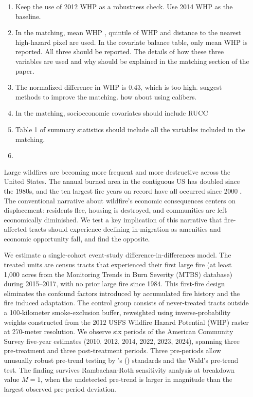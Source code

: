 \documentclass[12pt]{article}
\begin{document}
\begin{enumerate}
  \item Keep the use of 2012 WHP as a robustness check. Use 2014 WHP as the baseline.
  \item In the matching, mean WHP , quintile of WHP and distance to the nearest high-hazard pixel are used. In the covariate balance table, only mean WHP is reported. All three should be reported. The details of how these three variables are used and why should be explained in the matching section of the paper.
  \item The normalized difference in WHP is 0.43, which is too high. suggest methods to improve the matching. how about using calibers.
  \item In the matching, socioeconomic covariates should include RUCC
  \item Table 1 of summary statistics should include all the variables included in the matching.
  \item
\end{enumerate}

Large wildfires are becoming more frequent and more destructive across the
United States.
The annual burned area in the contiguous US has doubled since the 1980s,
and the ten largest fire years on record have all occurred since 2000
\citep{coulombe2025fires}.
The conventional narrative about wildfire's economic consequences
centers on displacement: residents flee, housing is destroyed,
and communities are left economically diminished.
We test a key implication of this narrative that fire-affected tracts
should experience declining in-migration as amenities and economic
opportunity fall, and find the opposite.

We estimate a single-cohort event-study difference-in-differences model.
The treated units are census tracts that experienced their first
large fire (at least 1,000 acres from the Monitoring Trends in Burn
Severity (MTBS) database) during 2015--2017, with no prior large fire
since 1984. This first-fire design eliminates the confound factors
introduced by accumulated fire history and the fire induced adaptation.
The control group consists of never-treated tracts outside a
100-kilometer smoke-exclusion buffer,
reweighted using inverse-probability weights constructed from the 2012
USFS Wildfire Hazard Potential (WHP) raster at 270-meter resolution.
We observe six periods of the American Community Survey five-year
estimates (2010, 2012, 2014, 2022, 2023, 2024),
spanning three pre-treatment and three post-treatment periods.
Three pre-periods allow unusually robust pre-trend testing by
\citeauthor{roth2022pretest}'s (\citeyear{roth2022pretest}) standards 
and the Wald's pre-trend test.
The finding survives Rambachan-Roth sensitivity analysis at breakdown value
$M = 1$, when the undetected pre-trend is larger in
magnitude than the largest observed pre-period deviation.
\end{document}
